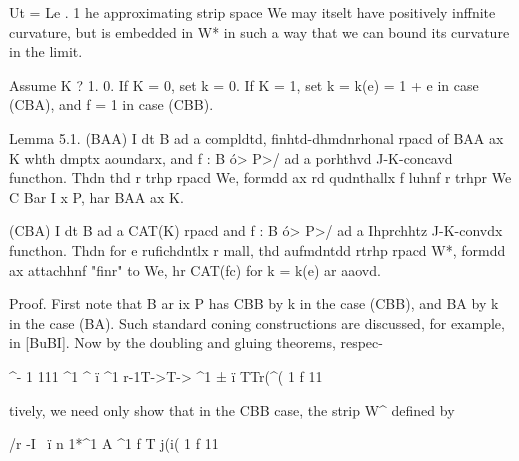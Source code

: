 Ut = Le . 1 he approximating strip space We may itselt have positively
inffnite curvature, but is embedded in W* in such a way that we can bound
its curvature in the limit.

Assume K ? {  1. 0}. If K = 0, set k = 0. If K =    1, set k = k(e) =
1 + e in case (CBA), and f =   1 in case (CBB).

Lemma 5.1. (BAA) I dt B ad a compldtd, finhtd-dhmdnrhonal rpacd of BAA
ax K whth dmptx aoundarx, and f : B ó> P>/ ad a porhthvd J-K-concavd
functhon. Thdn thd r trhp rpacd We, formdd ax rd qudnthallx f luhnf r trhpr
We    C Bar I x P, har BAA ax K.

(CBA) I dt B ad a CAT(K) rpacd and f : B ó> P>/ ad a Ihprchhtz
J-K-convdx functhon. Thdn for e rufichdntlx r mall, thd aufmdntdd rtrhp
rpacd W*, formdd ax attachhnf "finr" to We, hr CAT(fc) for k = k(e) ar
aaovd.

Proof. First note that B ar ix P has CBB by k in the case (CBB), and BA
by k in the case (BA). Such standard coning constructions are discussed,
for example, in [BuBI]. Now by the doubling and gluing theorems, respec-

^-       1                                                                                                                                                                                  111                                                                              ^1      ^   ï       ^1                                                   r-1T->T->                                                                                                                    ^1                                                                ±    ï       TTr(^(     1   f                                                     11

tively, we need only show that in the CBB case, the strip W^   defined by

/r   -I \    ï                                                                                                                                                                                                                                 n                                                                                                                                                                                                                  1*^1                                                                                                                   A                                                                                                                             ^1        f       T j(i(     1   f                                                     11

